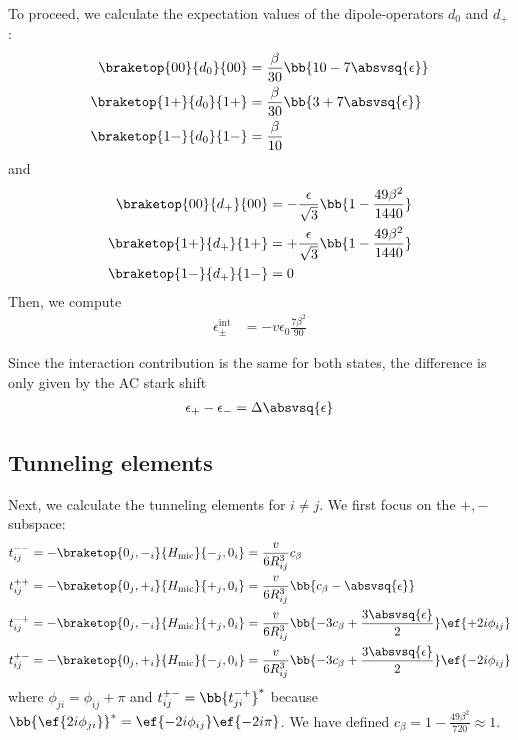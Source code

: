 To proceed, we calculate the expectation values of the dipole-operators $d_0$ and $d_+$:
\begin{align}
\braketop{00}{d_0}{00}&=\frac{\beta}{30} \bb{10-7 \absvsq{\epsilon}}\\
\braketop{1+}{d_0}{1+}&=\frac{\beta}{30} \bb{3+7 \absvsq{\epsilon}}\\
\braketop{1-}{d_0}{1-}&=\frac{\beta}{10}
\end{align}
and
\begin{align}
\braketop{00}{d_+}{00}&=-\frac{\epsilon}{\sqrt{3}} \bb{1-\frac{49\beta^2}{1440}} \\
\braketop{1+}{d_+}{1+}&=+\frac{\epsilon}{\sqrt{3}} \bb{1-\frac{49\beta^2}{1440}} \\
\braketop{1-}{d_+}{1-}&=0
\end{align}
Then, we compute
\begin{align}
\epsilon^\text{int}_{\pm}&=-v\epsilon_0 \frac{7\beta^2}{90}
\end{align}

Since the interaction contribution is the same for both states, the difference
is only given by the AC stark shift
\begin{align}
    \epsilon_+-\epsilon_- = \Delta \absvsq{\epsilon}
\end{align}

\subsection{Tunneling elements}
Next, we calculate the tunneling elements for $i\ne j$. We first focus on the $+,-$ subspace:
\begin{align}
t^{--}_{ij}&=-\braketop{0_j,-_i}{\Hmic}{-_j,0_i}=\frac{v}{6 R_{ij}^3}c_\beta \\
t^{++}_{ij}&=-\braketop{0_j,+_i}{\Hmic}{+_j,0_i}=\frac{v}{6 R_{ij}^3}\bb{c_\beta- \absvsq{\epsilon} }\\
t^{-+}_{ij}&=-\braketop{0_j,-_i}{\Hmic}{+_j,0_i}=\frac{v}{6 R_{ij}^3}\bb{-3c_\beta+\frac{3 \absvsq{\epsilon}}{2}}\ef{+2 i \phi_{ij}}\\
t^{+-}_{ij}&=-\braketop{0_j,+_i}{\Hmic}{-_j,0_i}=\frac{v}{6 R_{ij}^3}\bb{-3c_\beta+\frac{3 \absvsq{\epsilon}}{2}}\ef{-2 i \phi_{ij}}
\end{align}
where $\phi_{ji}=\phi_{ij}+\pi$ and $t^{+-}_{ij}=\bb{t^{-+}_{ji}}^*$ because $\bb{\ef{2i\phi_{ji}}}^* = \ef{-2i \phi_{ij}} \ef{-2 i \pi}$.
We have defined $c_\beta = 1-\frac{49 \beta ^2}{720}\approx 1$.


